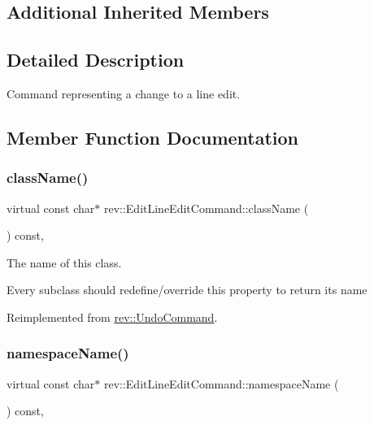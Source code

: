 \subsection*{Additional Inherited Members}


\subsection{Detailed Description}
Command representing a change to a line edit. 

\subsection{Member Function Documentation}
\mbox{\label{classrev_1_1_edit_line_edit_command_a08cedca4363770f54736cec4f35db942}} 
\subsubsection{\texorpdfstring{className()}{className()}}
{\footnotesize\ttfamily virtual const char$\ast$ rev\+::\+Edit\+Line\+Edit\+Command\+::class\+Name (\begin{DoxyParamCaption}{ }\end{DoxyParamCaption}) const\hspace{0.3cm}{\ttfamily [inline]}, {\ttfamily [virtual]}}



The name of this class. 

Every subclass should redefine/override this property to return its name 

Reimplemented from \mbox{\hyperlink{classrev_1_1_undo_command_ab30f020732532e7cfd5472bdee65dcdb}{rev\+::\+Undo\+Command}}.

\mbox{\label{classrev_1_1_edit_line_edit_command_a5289fd61a70c28475698a5f4cf30753b}} 
\subsubsection{\texorpdfstring{namespaceName()}{namespaceName()}}
{\footnotesize\ttfamily virtual const char$\ast$ rev\+::\+Edit\+Line\+Edit\+Command\+::namespace\+Name (\begin{DoxyParamCaption}{ }\end{DoxyParamCaption}) const\hspace{0.3cm}{\ttfamily [inline]}, {\ttfamily [virtual]}}



